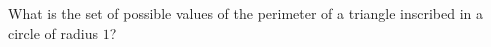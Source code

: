 What is the set of possible values of the perimeter of a triangle inscribed in a circle of radius $1$?

